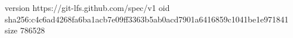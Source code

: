 version https://git-lfs.github.com/spec/v1
oid sha256:c4c6ad4268fa6ba1acb7e09ff3363b5ab0acd7901a6416859c1041be1e971841
size 786528
